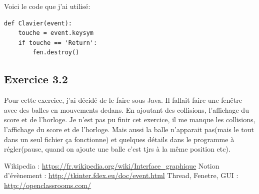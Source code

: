 \documentclass{article}
\begin{document}
\bigskip Voici le code que j'ai utilisé:
\begin{verbatim} 
def Clavier(event):
    touche = event.keysym
    if touche == 'Return':
        fen.destroy()
 \end{verbatim}

\subsection{Exercice 3.2}
Pour cette exercice, j'ai décidé de le faire sous Java. Il fallait faire une fenêtre avec des balles en mouvements dedans. En ajoutant des collisions, l'affichage du score et de l'horloge.
Je n'est pas pu finir cet exercice, il me manque les collisions, l'affichage du score et de l'horloge. Mais aussi la balle n'apparait pas(mais le tout dans un seul fichier ça fonctionne) et quelques détails dans le programme à régler(pause, quand on ajoute une balle c'est tjrs à la même position  etc).


\begin{thebibliography}{9}
         Wikipedia : \url {https://fr.wikipedia.org/wiki/Interface_graphique}
         Notion d'évènement : \url {http://tkinter.fdex.eu/doc/event.html}
	Thread, Fenetre, GUI : \url{http://openclassrooms.com/}
\end{thebibliography}
\end{document}
